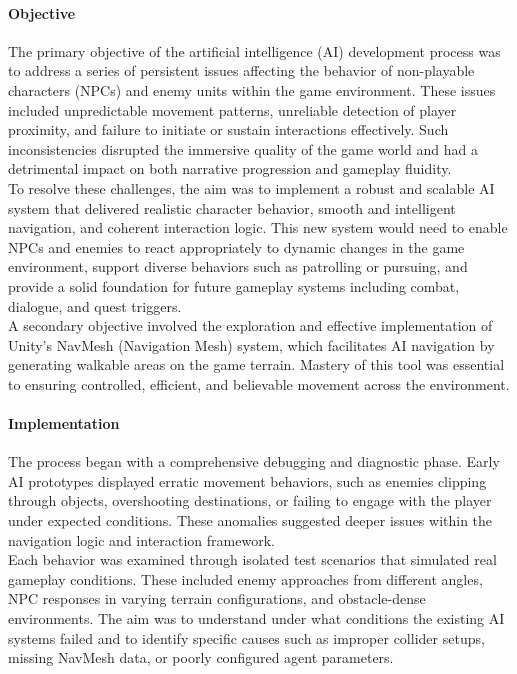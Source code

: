 \documentclass{article}
\begin{document}
\paragraph{Objective}\hfill

The primary objective of the artificial intelligence (AI) development process was to address a series of persistent issues affecting the behavior of non-playable characters (NPCs) and enemy units within the game environment. These issues included unpredictable movement patterns, unreliable detection of player proximity, and failure to initiate or sustain interactions effectively. Such inconsistencies disrupted the immersive quality of the game world and had a detrimental impact on both narrative progression and gameplay fluidity.\\

To resolve these challenges, the aim was to implement a robust and scalable AI system that delivered realistic character behavior, smooth and intelligent navigation, and coherent interaction logic. This new system would need to enable NPCs and enemies to react appropriately to dynamic changes in the game environment, support diverse behaviors such as patrolling or pursuing, and provide a solid foundation for future gameplay systems including combat, dialogue, and quest triggers.\\

A secondary objective involved the exploration and effective implementation of Unity's NavMesh (Navigation Mesh) system, which facilitates AI navigation by generating walkable areas on the game terrain. Mastery of this tool was essential to ensuring controlled, efficient, and believable movement across the environment.

\paragraph{Implementation}

The process began with a comprehensive debugging and diagnostic phase. Early AI prototypes displayed erratic movement behaviors, such as enemies clipping through objects, overshooting destinations, or failing to engage with the player under expected conditions. These anomalies suggested deeper issues within the navigation logic and interaction framework.\\

Each behavior was examined through isolated test scenarios that simulated real gameplay conditions. These included enemy approaches from different angles, NPC responses in varying terrain configurations, and obstacle-dense environments. The aim was to understand under what conditions the existing AI systems failed and to identify specific causes such as improper collider setups, missing NavMesh data, or poorly configured agent parameters.\\
\end{document}
